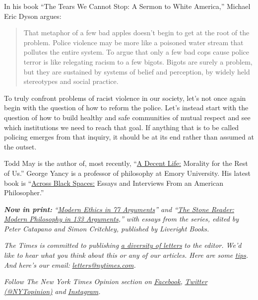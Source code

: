 In his book ``The Tears We Cannot Stop: A Sermon to White America,''
Michael Eric Dyson argues:

\begin{quote}
That metaphor of a few bad apples doesn't begin to get at the root of
the problem. Police violence may be more like a poisoned water stream
that pollutes the entire system. To argue that only a few bad cops cause
police terror is like relegating racism to a few bigots. Bigots are
surely a problem, but they are sustained by systems of belief and
perception, by widely held stereotypes and social practice.
\end{quote}

To truly confront problems of racist violence in our society, let's not
once again begin with the question of how to reform the police. Let's
instead start with the question of how to build healthy and safe
communities of mutual respect and see which institutions we need to
reach that goal. If anything that is to be called policing emerges from
that inquiry, it should be at its end rather than assumed at the outset.

Todd May is the author of, most recently,
``\href{https://press.uchicago.edu/ucp/books/book/chicago/D/bo34250692.html}{A
Decent Life:} Morality for the Rest of Us.'' George Yancy is a professor
of philosophy at Emory University. His latest book is
``\href{https://rowman.com/ISBN/9781538131619/Across-Black-Spaces-Essays-and-Interviews-from-an-American-Philosopher}{Across
Black Spaces:} Essays and Interviews From an American Philosopher.''

\emph{\textbf{Now in print:}}
\emph{``}\href{http://bitly.com/1MW2kN3}{\emph{Modern Ethics in 77
Arguments}}\emph{'' and ``}\href{http://bitly.com/1MW2kN3}{\emph{The
Stone Reader: Modern Philosophy in 133 Arguments}}\emph{,'' with essays
from the series, edited by Peter Catapano and Simon Critchley, published
by Liveright Books.}

\emph{The Times is committed to publishing}
\href{https://www.nytimes.com/2019/01/31/opinion/letters/letters-to-editor-new-york-times-women.html}{\emph{a
diversity of letters}} \emph{to the editor. We'd like to hear what you
think about this or any of our articles. Here are some}
\href{https://help.nytimes.com/hc/en-us/articles/115014925288-How-to-submit-a-letter-to-the-editor}{\emph{tips}}\emph{.
And here's our email:}
\href{mailto:letters@nytimes.com}{\emph{letters@nytimes.com}}\emph{.}

\emph{Follow The New York Times Opinion section on}
\href{https://www.facebook.com/nytopinion}{\emph{Facebook}}\emph{,}
\href{http://twitter.com/NYTOpinion}{\emph{Twitter (@NYTopinion)}}
\emph{and}
\href{https://www.instagram.com/nytopinion/}{\emph{Instagram}}\emph{.}

